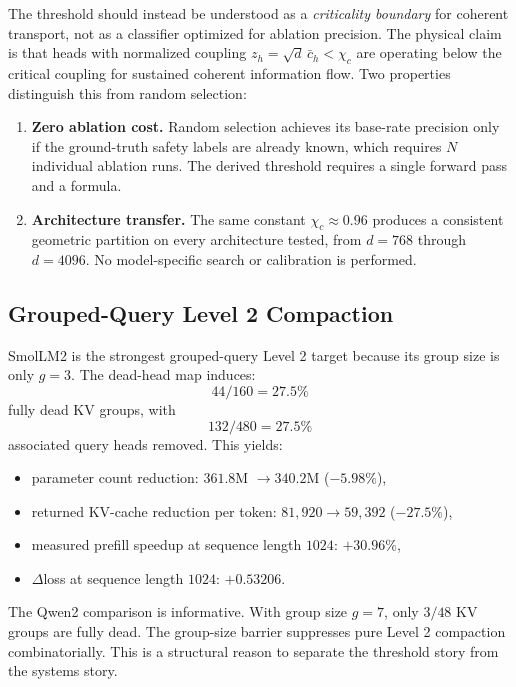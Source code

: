 \documentclass[aps,prd,onecolumn,superscriptaddress,showpacs,12pt]{revtex4-2}
\newcommand{\chic}{\chi_c}
\newcommand{\meancoupling}{\bar{c}_h}
\begin{document}
The threshold should instead be understood as a \emph{criticality boundary}
for coherent transport, not as a classifier optimized for ablation
precision. The physical claim is that heads with normalized coupling
$z_h = \sqrt{d}\,\meancoupling < \chic$ are operating below the critical
coupling for sustained coherent information flow. Two properties
distinguish this from random selection:
\begin{enumerate}
\item \textbf{Zero ablation cost.} Random selection achieves its base-rate
precision only if the ground-truth safety labels are already known, which
requires $N$ individual ablation runs. The derived threshold requires a single
forward pass and a formula.
\item \textbf{Architecture transfer.} The same constant $\chic \approx 0.96$
produces a consistent geometric partition on every architecture tested, from
$d=768$ through $d=4096$. No model-specific search or calibration is performed.
\end{enumerate}

\subsection{Grouped-Query Level 2 Compaction}

SmolLM2 is the strongest grouped-query Level 2 target because its group size is only
$g=3$. The dead-head map induces:
\begin{equation}
44/160 = 27.5\%
\end{equation}
fully dead KV groups, with
\begin{equation}
132/480 = 27.5\%
\end{equation}
associated query heads removed. This yields:
\begin{itemize}
\item parameter count reduction: $361.8$M $\rightarrow 340.2$M ($-5.98\%$),
\item returned KV-cache reduction per token: $81{,}920 \rightarrow 59{,}392$
($-27.5\%$),
\item measured prefill speedup at sequence length $1024$: $+30.96\%$,
\item $\Delta$loss at sequence length $1024$: $+0.53206$.
\end{itemize}

The Qwen2 comparison is informative. With group size $g=7$, only $3/48$ KV groups
are fully dead. The group-size barrier suppresses pure Level 2 compaction
combinatorially. This is a structural reason to separate the threshold story from
the systems story.
\end{document}
